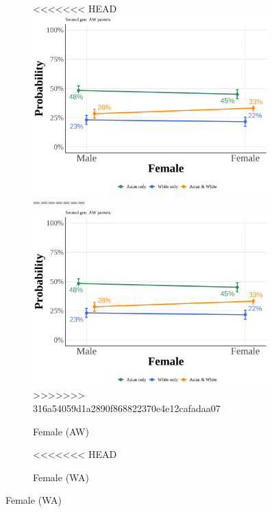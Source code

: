 \begin{center}
\begin{figure}[!htb]
\begin{subfigure}{.48\textwidth}
\caption{Female (AW)}
\centering
<<<<<<< HEAD
\includegraphics[width=1\linewidth]{pp_second_aw_Female_simple.png}\label{subfig:pp-secgen-aw-female}
=======
\includegraphics[width=1\linewidth]{pp_second_aw_Female_simple.png}
>>>>>>> 316a54059d1a2890f868822370e4e12cafadaa07
\end{subfigure}
\hfill
\begin{subfigure}{.48\textwidth}
\caption{Female (WA)}
\centering
<<<<<<< HEAD

\end{subfigure}
\end{figure}
\end{center}
